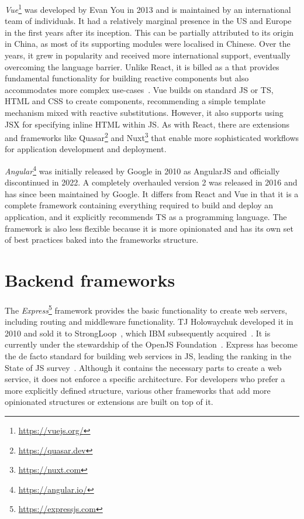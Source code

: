 \emph{Vue}\footnote{\url{https://vuejs.org/}} was developed by Evan You in 2013 and is maintained by an international team of individuals.
It had a relatively marginal presence in the US and Europe in the first years after its inception.
This can be partially attributed to its origin in China, as most of its supporting modules were localised in Chinese.
Over the years, it grew in popularity and received more international support, eventually overcoming the language barrier.
Unlike React, it is billed as a  that provides fundamental functionality for building reactive components but also accommodates more complex use-cases~\parencite{vueProgressiveFramework}.
Vue builds on standard \ac{JS} or \ac{TS}, \ac{HTML} and \ac{CSS} to create components, recommending a simple template mechanism mixed with reactive substitutions.
However, it also supports using \ac{JSX} for specifying inline \ac{HTML} within \ac{JS}.
As with React, there are extensions and frameworks like Quasar\footnote{\url{https://quasar.dev}} and Nuxt\footnote{\url{https://nuxt.com}} that enable more sophisticated workflows for application development and deployment.

\emph{Angular}\footnote{\url{https://angular.io/}} was initially released by Google in 2010 as AngularJS and officially discontinued in 2022.
A completely overhauled version 2 was released in 2016 and has since been maintained by Google.
It differs from React and Vue in that it is a complete framework containing everything required to build and deploy an application, and it explicitly recommends \ac{TS} as a programming language.
The framework is also less flexible because it is more opinionated and has its own set of best practices baked into the framework\textquotesingle s structure.

\section{Backend frameworks}
\label{sec:backend-frameworks}

The \emph{Express}\footnote{\url{https://expressjs.com}} framework provides the basic functionality to create web servers, including routing and middleware functionality.
TJ Holowaychuk developed it in 2010 and sold it to StrongLoop~\parencite{expressJsStrongLoop}, which IBM subsequently acquired~\parencite{expressJsStrongLoopIbm}.
It is currently under the stewardship of the OpenJS Foundation~\parencite{expressJsNodeFoundation}.
Express has become the de facto standard for building web services in JS, leading the ranking in the State of JS survey~\parencite{mostUsedBackendFrameworks22}.
Although it contains the necessary parts to create a web service, it does not enforce a specific architecture.
For developers who prefer a more explicitly defined structure, various other frameworks that add more opinionated structures or extensions are built on top of it.


